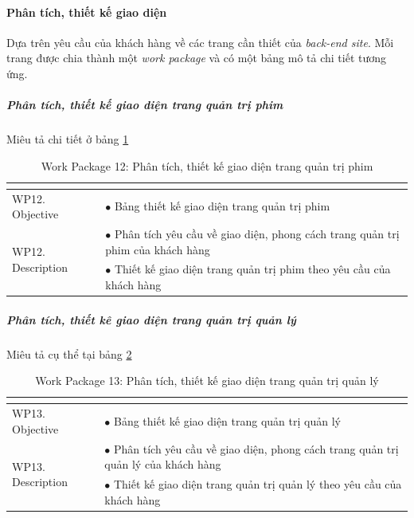 \documentclass[a4paper]{book}
\begin{document}
\paragraph{Phân tích, thiết kế giao diện}
Dựa trên yêu cầu của khách hàng về các trang cần thiết của \textit{back-end site}. Mỗi trang được chia thành một \textit{work package} và có một bảng mô tả chi tiết tương ứng.
\subparagraph{Phân tích, thiết kế giao diện trang quản trị phim} Miêu tả chi tiết ở bảng \ref{table:backend_thietke_giaodien_phim}
\begin{table}[h!]
	\begin{center}
		\begin{tabular}{|p{4cm}|p{10cm}|}
			\hline
			\multicolumn{2}{|c|}{\cellcolor[HTML]{363636}{\color[HTML]{FFFFFF}Work package 12: Phân tích, thiết kế giao diện trang quản trị phim}}\\
			\hline
			\multirow{1}{*}{WP12. Objective} & $\bullet$ Bảng thiết kế giao diện trang quản trị phim\\
			\hline
			\multirow{2}{*}{WP12. Description} & $\bullet$ Phân tích yêu cầu về giao diện, phong cách trang quản trị phim của khách hàng \\
			& $\bullet$ Thiết kế giao diện trang quản trị phim theo yêu cầu của khách hàng\\
			\hline
		\end{tabular}
		\caption{Work Package 12: Phân tích, thiết kế giao diện trang quản trị phim}
		\label{table:backend_thietke_giaodien_phim}
	\end{center}
\end{table}
\subparagraph{Phân tích, thiết kê giao diện trang quản trị quản lý} Miêu tả cụ thể tại bảng \ref{table:backend_thietke_giaodien_quanly}
\begin{table}[h!]
	\begin{center}
		\begin{tabular}{|p{4cm}|p{10cm}|}
			\hline
			\multicolumn{2}{|c|}{\cellcolor[HTML]{363636}{\color[HTML]{FFFFFF}Work package 13: Phân tích, thiết kế giao diện trang quản trị pquản lý}}\\
			\hline
			\multirow{1}{*}{WP13. Objective} & $\bullet$ Bảng thiết kế giao diện trang quản trị quản lý\\
			\hline
			\multirow{2}{*}{WP13. Description} & $\bullet$ Phân tích yêu cầu về giao diện, phong cách trang quản trị quản lý của khách hàng \\
			& $\bullet$ Thiết kế giao diện trang quản trị quản lý theo yêu cầu của khách hàng\\
			\hline
		\end{tabular}
		\caption{Work Package 13: Phân tích, thiết kế giao diện trang quản trị quản lý}
		\label{table:backend_thietke_giaodien_quanly}
	\end{center}
\end{table}
\end{document}
